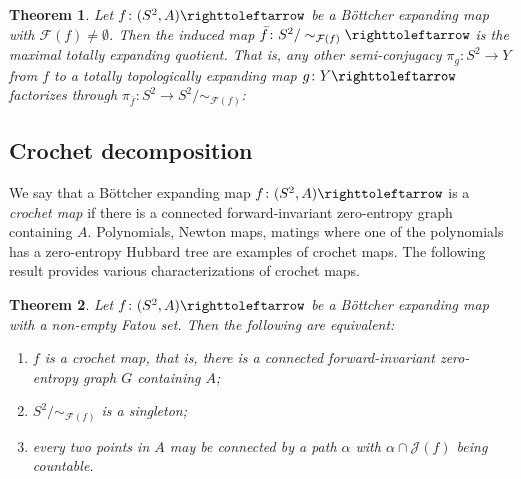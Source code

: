 \documentclass{amsart}
\newtheorem{maintheorem}{Theorem}
\theoremstyle{plain}
\theoremstyle{definition}
\theoremstyle{remark}
\newcommand{\Fat}{{\mathcal F}}
\newcommand{\Jul}{{\mathcal J}}
\newcommand\selfmap{\righttoleftarrow}
\begin{document}
\begin{maintheorem}
\label{thm: max exp quotient}
Let $f\colon(S^2,A)\selfmap$ be a B\"ottcher expanding map with $\Fat(f)\not=\emptyset$. Then the induced map $\bar f\colon S^2/\sim_{\Fat(f)}\selfmap$ is the maximal totally expanding quotient. That is, any other semi-conjugacy $\pi_g\colon S^2\to Y$ from $f$ to a totally topologically expanding map $g\colon Y\selfmap$ factorizes through $\pi_{\overline f}\colon S^2\to S^2/{\sim_{\Fat(f)}}$:

\begin{center}
\end{center}
\end{maintheorem}


\subsection{Crochet decomposition} We say that a B\"ottcher expanding map $f\colon(S^2,A)\selfmap$ is a \emph{crochet map} if there is a connected forward-invariant zero-entropy graph containing $A$. Polynomials, Newton maps, matings where one of the polynomials has a zero-entropy Hubbard tree are examples of crochet maps.  The following result provides various characterizations of crochet maps.

\begin{maintheorem}
\label{thm:crochet_inro}
Let $f\colon(S^2,A)\selfmap$  be a B\"ottcher expanding map with a non-empty Fatou set. Then the following are equivalent:
\begin{enumerate}[label=\text{(\roman*)},font=\normalfont,leftmargin=*]
\item $f$ is a crochet map, that is,  there is a connected forward-invariant zero-entropy graph $G$ containing $A$; 
\item $S^2/\sim_{\Fat(f)}$ is a singleton;
\item every two points in $A$ may be connected by a path $\alpha$ with $\alpha\cap\Jul(f)$ being countable.
\end{enumerate}
\end{maintheorem}
\end{document}
